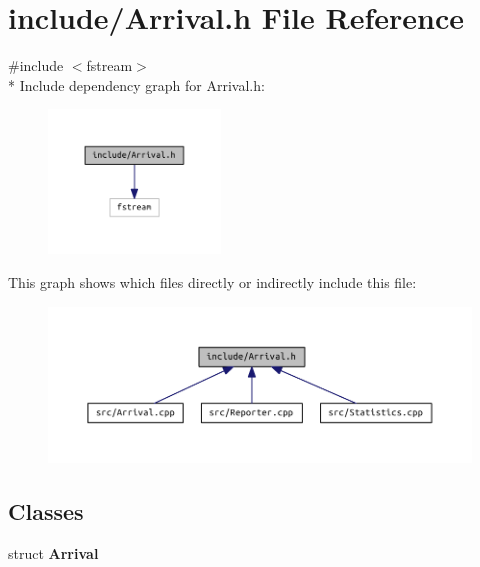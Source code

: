 \section{include/\+Arrival.h File Reference}
\label{_arrival_8h}
{\ttfamily \#include $<$fstream$>$}\\*
Include dependency graph for Arrival.\+h\+:\nopagebreak
\begin{figure}[H]
\begin{center}
\leavevmode
\includegraphics[width=130pt]{_arrival_8h__incl}
\end{center}
\end{figure}
This graph shows which files directly or indirectly include this file\+:\nopagebreak
\begin{figure}[H]
\begin{center}
\leavevmode
\includegraphics[width=343pt]{_arrival_8h__dep__incl}
\end{center}
\end{figure}
\subsection*{Classes}
\begin{DoxyCompactItemize}
\item 
struct {\bf Arrival}
\end{DoxyCompactItemize}
